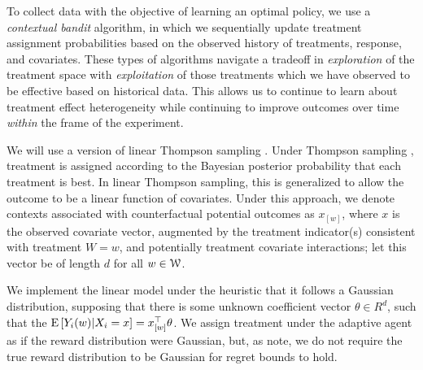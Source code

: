 \documentclass[letterpaper, 12pt, parskip=full,]{scrartcl}
\begin{document}
To collect data with the objective of learning an optimal policy, we use a \textit{contextual bandit} algorithm, in which we sequentially update treatment assignment probabilities based on the observed history of treatments, response, and covariates. These types of algorithms navigate a tradeoff in \textit{exploration} of the treatment space with \textit{exploitation} of those treatments which we have observed to be effective based on historical data. This allows us to continue to learn about treatment effect heterogeneity while continuing to improve outcomes over time \textit{within} the frame of the experiment. 

We will use a version of linear Thompson sampling \citep{agrawal2013thompson}. Under Thompson sampling \citep{thompson1933likelihood,thompson1935theory}, treatment is assigned according to the Bayesian posterior probability that each treatment is best. In linear Thompson sampling, this is generalized to allow the outcome to be a linear function of covariates. Under this approach, we denote contexts associated with counterfactual potential outcomes as $x_{[w]}$, where $x$ is the observed covariate vector, augmented by the treatment indicator(s) consistent with treatment $W =w$, and potentially treatment covariate interactions; let this vector be of length $d$ for all $w \in {\EuScript W}$. 

We implement the linear model under the heuristic that it follows a Gaussian distribution, supposing that there is some unknown coefficient vector $\theta\in R^{d}$, such that the ${\textrm E}\,[Y_i(w)|X_i = x] = x_{[w]}^\top \theta$. %
We assign treatment under the adaptive agent as if the reward distribution were Gaussian, but, as \cite{agrawal2013thompson} note, we do not require the true reward distribution to be Gaussian for regret bounds to hold. 

\end{document}
